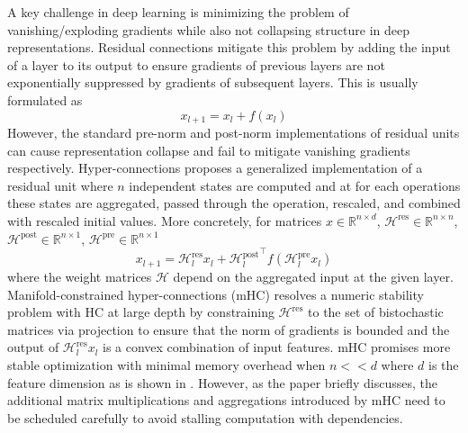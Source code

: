 \documentclass{article}
\newcommand{\R}{\mathbb{R}}
\begin{document}
A key challenge in deep learning is minimizing the problem of vanishing/exploding gradients while also not collapsing structure in deep representations. Residual connections mitigate this problem by adding the input of a layer to its output to ensure gradients of previous layers are not exponentially suppressed by gradients of subsequent layers. This is usually formulated as
$$x_{l+1} = x_l + f(x_l)$$
However, the standard pre-norm and post-norm implementations of residual units can cause representation collapse and fail to mitigate vanishing gradients respectively. Hyper-connections \cite{zhu_hyper-connections_2025} proposes a generalized implementation of a residual unit where $n$ independent states are computed and at for each operations these states are aggregated, passed through the operation, rescaled, and combined with rescaled initial values. More concretely, for matrices $x \in \R^{n \times d}$, $\mathcal{H}^\text{res} \in \R^{n \times n}$, $\mathcal{H}^\text{post} \in \R^{n \times 1}$, $\mathcal{H}^\text{pre} \in \R^{n \times 1}$
$$x_{l+1} = \mathcal{H}^{\text{res}}_l x_l + {\mathcal{H}^\text{post}_l}^\top f(\mathcal{H}^\text{pre}_lx_l)$$
where the weight matrices $\mathcal{H}$ depend on the aggregated input at the given layer. Manifold-constrained hyper-connections (mHC) resolves a numeric stability problem with HC at large depth by constraining $\mathcal{H}^\text{res}$ to the set of bistochastic matrices via projection to ensure that the norm of gradients is bounded and the output of $\mathcal{H}^\text{res}_lx_l$ is a convex combination of input features. mHC promises more stable optimization with minimal memory overhead when $n << d$ where $d$ is the feature dimension as is shown in \cite{xie_mhc_2026}. However, as the paper briefly discusses, the additional matrix multiplications and aggregations introduced by mHC need to be scheduled carefully to avoid stalling computation with dependencies.
\end{document}
